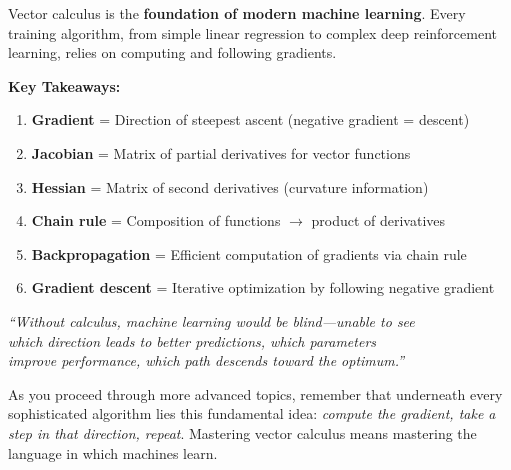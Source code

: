 Vector calculus is the \textbf{foundation of modern machine learning}. Every training algorithm, from simple linear regression to complex deep reinforcement learning, relies on computing and following gradients.

\textbf{Key Takeaways:}

\begin{enumerate}
    \item \textbf{Gradient} = Direction of steepest ascent (negative gradient = descent)
    \item \textbf{Jacobian} = Matrix of partial derivatives for vector functions
    \item \textbf{Hessian} = Matrix of second derivatives (curvature information)
    \item \textbf{Chain rule} = Composition of functions $\to$ product of derivatives
    \item \textbf{Backpropagation} = Efficient computation of gradients via chain rule
    \item \textbf{Gradient descent} = Iterative optimization by following negative gradient
\end{enumerate}

\begin{center}
\itshape
``Without calculus, machine learning would be blind—unable to see \\
which direction leads to better predictions, which parameters \\
improve performance, which path descends toward the optimum.''
\end{center}

\vspace{1cm}

As you proceed through more advanced topics, remember that underneath every sophisticated algorithm lies this fundamental idea: \textit{compute the gradient, take a step in that direction, repeat}. Mastering vector calculus means mastering the language in which machines learn.

\clearpage
